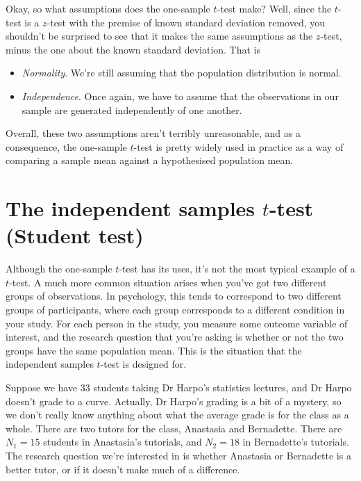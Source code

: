 \documentclass[
  11pt,
  a4paper,
  twoside,symmetric,openright]{book}
\providecommand{\tightlist}{%
  \setlength{\itemsep}{0pt}\setlength{\parskip}{0pt}}
\theoremstyle{break}
\theoremstyle{break}
\begin{document}
Okay, so what assumptions does the one-sample \(t\)-test make? Well, since the \(t\)-test is a \(z\)-test with the premise of known standard deviation removed, you shouldn't be surprised to see that it makes the same assumptions as the \(z\)-test, minus the one about the known standard deviation. That is

\begin{itemize}
\tightlist
\item
  \emph{Normality}. We're still assuming that the population distribution is normal.
\item
  \emph{Independence}. Once again, we have to assume that the observations in our sample are generated independently of one another.
\end{itemize}

Overall, these two assumptions aren't terribly unreasonable, and as a consequence, the one-sample \(t\)-test is pretty widely used in practice as a way of comparing a sample mean against a hypothesised population mean.

\section{\texorpdfstring{The independent samples \(t\)-test (Student test)}{The independent samples t-test (Student test)}}\label{studentttest}

Although the one-sample \(t\)-test has its uses, it's not the most typical example of a \(t\)-test. A much more common situation arises when you've got two different groups of observations. In psychology, this tends to correspond to two different groups of participants, where each group corresponds to a different condition in your study. For each person in the study, you measure some outcome variable of interest, and the research question that you're asking is whether or not the two groups have the same population mean. This is the situation that the independent samples \(t\)-test is designed for.

Suppose we have 33 students taking Dr Harpo's statistics lectures, and Dr Harpo doesn't grade to a curve. Actually, Dr Harpo's grading is a bit of a mystery, so we don't really know anything about what the average grade is for the class as a whole. There are two tutors for the class, Anastasia and Bernadette. There are \(N_1 = 15\) students in Anastasia's tutorials, and \(N_2 = 18\) in Bernadette's tutorials. The research question we're interested in is whether Anastasia or Bernadette is a better tutor, or if it doesn't make much of a difference.
\end{document}
